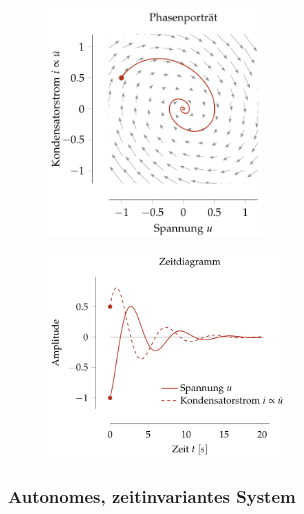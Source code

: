 \documentclass[
  10pt,
  a4paper,
]{article}
\numberwithin{equation}{section}
\begin{document}
\begin{multicols}{2}
\begin{figure}[H]

{\centering \includegraphics[width=5.7cm,height=\textheight]{images/state_space/quiver.png}

}

\end{figure}

\begin{figure}[H]

{\centering \includegraphics[width=6.3cm,height=\textheight]{images/state_space/time.png}

}

\end{figure}

\hypertarget{autonomes-zeitinvariantes-system}{%
\subsubsection{Autonomes, zeitinvariantes
System}\label{autonomes-zeitinvariantes-system}}

\begin{center}
\end{center}


\end{multicols}
\end{document}
